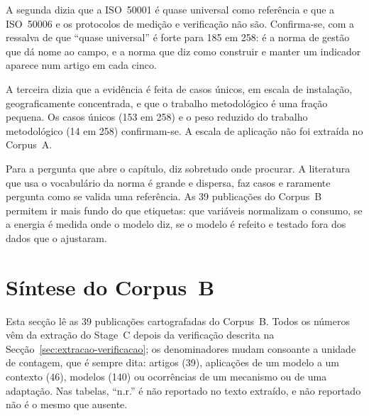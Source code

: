 A segunda dizia que a ISO~50001 é quase universal como referência e que a
ISO~50006 e os protocolos de medição e verificação não são. Confirma-se, com
a ressalva de que ``quase universal'' é forte para 185 em 258: é a norma de
gestão que dá nome ao campo, e a norma que diz como construir e manter um
indicador aparece num artigo em cada cinco. 

A terceira dizia que a evidência é feita de casos únicos, em escala de
instalação, geograficamente concentrada, e que o trabalho metodológico é uma
fração pequena. Os casos únicos (153 em 258) e o peso reduzido do trabalho
metodológico (14 em 258) confirmam-se. A escala de aplicação não foi
extraída no Corpus~A.

Para a pergunta que abre o capítulo,  diz
sobretudo onde procurar.
A literatura que usa o vocabulário da norma é grande e dispersa, faz casos
e raramente pergunta como se valida uma referência. As 39 publicações do
Corpus~B permitem ir mais fundo do que etiquetas: que variáveis normalizam o
consumo, se a energia é medida onde o modelo diz, se o modelo é refeito e
testado fora dos dados que o ajustaram.

\section{Síntese do Corpus~B}
\label{sec:corpus-b}

Esta secção lê as 39 publicações cartografadas do Corpus~B. Todos os números
vêm da extração do Stage~C depois da verificação descrita na
Secção~\ref{sec:extracao-verificacao}; os denominadores mudam consoante a
unidade de contagem, que é sempre dita: artigos (39), aplicações de um
modelo a um contexto (46), modelos (140) ou ocorrências de um mecanismo ou de
uma adaptação. Nas tabelas, ``n.r.'' é não reportado no texto extraído, e
não reportado não é o mesmo que ausente.


